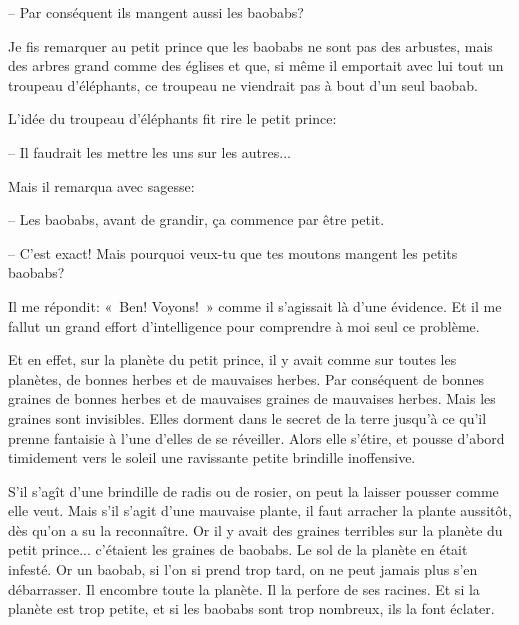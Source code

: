 \documentclass[a4paper]{report}
\begin{document}
-- Par conséquent ils mangent aussi les baobabs?

Je fis remarquer au petit prince que les baobabs ne sont pas des arbustes, mais des arbres grand comme des églises et que, si même il emportait avec lui tout un troupeau d'éléphants, ce troupeau ne viendrait pas à bout d'un seul baobab.

L'idée du troupeau d'éléphants fit rire le petit prince:

-- Il faudrait les mettre les uns sur les autres...

Mais il remarqua avec sagesse:


-- Les baobabs, avant de grandir, ça commence par être petit.

-- C'est exact! Mais pourquoi veux-tu que tes moutons mangent les petits baobabs?

Il me répondit: «~Ben! Voyons!~» comme il s'agissait là d'une évidence. Et il me fallut un grand effort d'intelligence pour comprendre à moi seul ce problème.

Et en effet, sur la planète du petit prince, il y avait comme sur toutes les planètes, de bonnes herbes et de mauvaises herbes. Par conséquent de bonnes graines de bonnes herbes et de mauvaises graines de mauvaises herbes. Mais les graines sont invisibles. Elles dorment dans le secret de la terre jusqu'à ce qu'il prenne fantaisie à l'une d'elles de se réveiller. Alors elle s'étire, et pousse d'abord timidement vers le soleil une ravissante petite brindille inoffensive.

S'il s'agît d'une brindille de radis ou de rosier, on peut la laisser pousser comme elle veut. Mais s'il s'agit d'une mauvaise plante, il faut arracher la plante aussitôt, dès qu'on a su la reconnaître. Or il y avait des graines terribles sur la planète du petit prince... c'étaient les graines de baobabs. Le sol de la planète en était infesté. Or un baobab, si l'on si prend trop tard, on ne peut jamais plus s'en débarrasser. Il encombre toute la planète. Il la perfore de ses racines. Et si la planète est trop petite, et si les baobabs sont trop nombreux, ils la font éclater.
\end{document}

